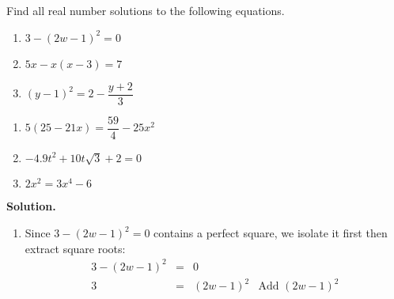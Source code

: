 \documentclass{ximera}
\begin{document}
\begin{ex}\label{reviewquadraticex}  Find all real number solutions to the following equations.

\begin{multicols}{3}

\begin{enumerate}

\item $3 - (2w-1)^2 = 0$

\item $5x - x(x-3) = 7$

\item  $(y-1)^2 = 2 - \dfrac{y+2}{3}$ 

\setcounter{HW}{\value{enumi}}

\end{enumerate}
\end{multicols}

\begin{multicols}{3}

\begin{enumerate}

\setcounter{enumi}{\value{HW}}

\item $5(25 - 21x) = \dfrac{59}{4} - 25x^2$

\item $-4.9t^2 + 10t\sqrt{3} + 2 = 0$ 



\item $2x^2 = 3x^4 - 6$



\setcounter{HW}{\value{enumi}}

\end{enumerate}
\end{multicols}

{\bf Solution.}

\begin{enumerate}

\item  Since $3 - (2w-1)^2 = 0$ contains a perfect square, we isolate it first then extract square roots: \[ \begin{array}{rclr}

3 - (2w-1)^2 & = & 0 & \\

3 & = & (2w-1)^2 & \text{Add $(2w-1)^2$} \\


\end{array}\]
\end{enumerate}
\end{ex}
\end{document}
